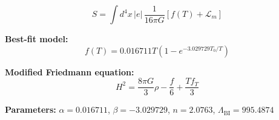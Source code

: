 
\begin{equation}
  S = \int d^4x \, |e| \, \frac{1}{16\pi G} \left[ f(T) + \mathcal{L}_m \right]
\end{equation}

\textbf{Best-fit model:}
\begin{equation}
  f(T) = 0.016711 T \left(1 - e^{-3.029729 T_0 / T}\right)
\end{equation}

\textbf{Modified Friedmann equation:}
\begin{equation}
  H^2 = \frac{8\pi G}{3} \rho - \frac{f}{6} + \frac{T f_T}{3}
\end{equation}

\textbf{Parameters:}
$\alpha = 0.016711$, \quad
$\beta = -3.029729$, \quad
$n = 2.0763$, \quad
$\Lambda_{\text{BI}} = 995.4874$